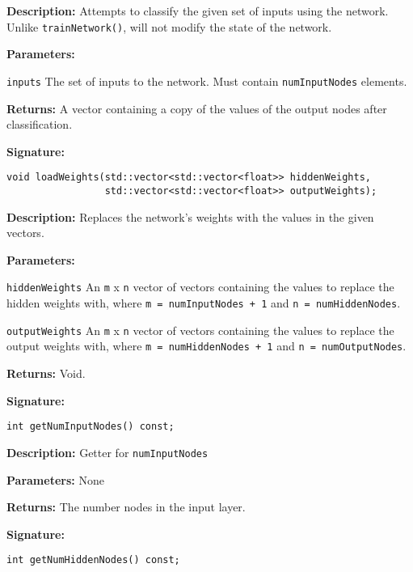 \documentclass[a4paper]{article}
\begin{document}
\textbf{Description: }
Attempts to classify the given set of inputs using the network. Unlike \lstinline{trainNetwork()}, will not modify the state of the network.

\textbf{Parameters: }

\lstinline{inputs} The set of inputs to the network. Must contain \lstinline{numInputNodes} elements.

\textbf{Returns: }
A vector containing a copy of the values of the output nodes after classification.
\hrulefill %

\textbf{Signature:} \begin{lstlisting}
void loadWeights(std::vector<std::vector<float>> hiddenWeights,
                 std::vector<std::vector<float>> outputWeights);
\end{lstlisting}

\textbf{Description: }
Replaces the network's weights with the values in the given vectors.

\textbf{Parameters: }

\lstinline{hiddenWeights} An \lstinline{m} x \lstinline{n} vector of vectors containing the values to replace the hidden weights with, where \lstinline{m = numInputNodes + 1} and \lstinline{n = numHiddenNodes}.

\lstinline{outputWeights} An \lstinline{m} x \lstinline{n} vector of vectors containing the values to replace the output weights with, where \lstinline{m = numHiddenNodes + 1} and \lstinline{n = numOutputNodes}.

\textbf{Returns: } Void.

\hrulefill %

\textbf{Signature:} \begin{lstlisting}
int getNumInputNodes() const;
\end{lstlisting}

\textbf{Description: }
Getter for \lstinline{numInputNodes}

\textbf{Parameters: } None

\textbf{Returns: }
The number nodes in the input layer.

\hrulefill %

\textbf{Signature:} \begin{lstlisting}
int getNumHiddenNodes() const;
\end{lstlisting}
\end{document}
